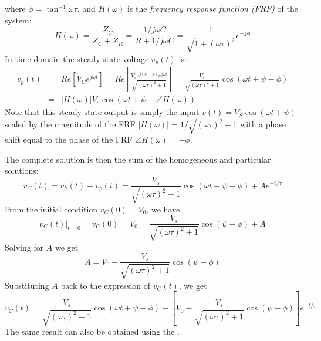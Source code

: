 \documentclass{article}
\begin{document}
where $\phi=\tan^{-1} \omega \tau$, and $H(\omega)$ is the 
{\em frequency response function (FRF)} of the system:
\begin{equation}
  H(\omega)=\frac{Z_C}{Z_C+Z_R}=\frac{1/j\omega C}{R+1/j\omega C}
  =\frac{1}{\sqrt{1+(\omega\tau)^2}} e^{-j\phi}
\end{equation}
In time domain the steady state voltage $v_p(t)$ is:
\begin{eqnarray}
  v_p(t)&=&Re\left[\dot{V}_C e^{j\omega t} \right]
  =Re\left[ \frac{V_s e^{j(\psi-\phi)} e^{j\omega t}}{\sqrt{(\omega \tau)^2+1}} \right]
  = \frac{V_s}{\sqrt{(\omega \tau)^2+1}} \cos(\omega t+\psi-\phi)
  \nonumber\\
  &=&|H(\omega)|V_s\cos(\omega t+\psi-\angle H(\omega))
\end{eqnarray}
Note that this steady state output is simply the 
input $v(t)=V_S\cos(\omega t+\psi)$ scaled by the magnitude of the FRF
$|H(\omega)|=1/\sqrt{(\omega\tau)^2+1}$ with a phase shift equal to the 
phase of the FRF $\angle H(\omega)=-\phi$.

The complete solution is then the sum of the homogeneous and particular
solutions:
\begin{equation}
  v_C(t)=v_h(t)+v_p(t)=
  \frac{V_s}{\sqrt{(\omega \tau)^2+1}}\cos(\omega t+\psi-\phi)+A e^{-t/\tau} 
\end{equation}
From the initial condition $v_C(0)=V_0$, we have
\begin{equation}
  v_C(t)\bigg|_{t=0}=v_C(0)
  =V_0=\frac{V_s}{\sqrt{(\omega \tau)^2+1}}\cos(\psi-\phi)+A 
\end{equation}
Solving for $A$ we get
\begin{equation}
  A=V_0-\frac{V_s}{\sqrt{(\omega \tau)^2+1}}\cos(\psi-\phi) 
\end{equation}
Substituting $A$ back to the expression of $v_C(t)$, we get 
\begin{equation}
  v_C(t)=\frac{V_s}{\sqrt{(\omega \tau)^2+1}}\cos(\omega t+\psi-\phi)+ 
  \left[V_0-\frac{V_s}{\sqrt{(\omega \tau)^2+1}}\cos(\psi-\phi)\right] e^{-t/\tau}
\end{equation}
The same result can also be obtained using the 
.
\end{document}
